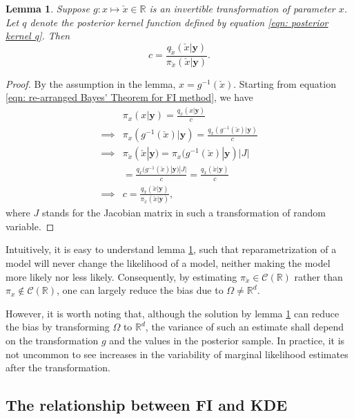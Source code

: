 \documentclass[%
 reprint,
 amsmath,amssymb,
 aps,
]{revtex4-2}
\newtheorem{lemma}[theorem]{Lemma}
\def\R{\mathbb{R}}
\def\ybold{\mathbf{y}}
\begin{document}
\begin{lemma} \label{lemma: FI transforming the re-arranged Bayes theorem}
    Suppose $g: x \mapsto \check{x} \in \R$ is an invertible transformation of parameter $x$. Let $q$ denote the posterior kernel function defined by equation \eqref{eqn: posterior kernel q}. Then 
    \begin{equation*}
        c = \frac{q_{\check{x}}(\check{x}|\ybold)}{\pi_{\check{x}}(\check{x}|\ybold)}.
    \end{equation*}
\end{lemma}
\begin{proof}
    By the assumption in the lemma, $x = g^{-1}(\check{x})$. Starting from equation \eqref{eqn: re-arranged Bayes' Theorem for FI method}, we have
    \begin{align*}
        & \pi_x(x|\ybold) = \frac{q_x(x|\ybold)}{c} \\
        \implies & \pi_x(g^{-1}(\check{x})|\ybold) = \frac{q_x(g^{-1}(\check{x})|\ybold)}{c} \\
        \implies & \pi_{\check{x}}(\check{x}|\ybold) = \pi_x(g^{-1}(\check{x})|\ybold)|J| \\
        & = \frac{q_x(g^{-1}(\check{x})|\ybold)|J|}{c} = \frac{q_{\check{x}}(\check{x}|\ybold)}{c} \\
        \implies & c = \frac{q_{\check{x}}(\check{x}|\ybold)}{\pi_{\check{x}}(\check{x}|\ybold)},
    \end{align*}
    where $J$ stands for the Jacobian matrix in such a transformation of random variable.
\end{proof}
Intuitively, it is easy to understand lemma \ref{lemma: FI transforming the re-arranged Bayes theorem}, such that reparametrization of a model will never change the likelihood of a model, neither making the model more likely nor less likely. Consequently, by estimating $\pi_{\check{x}} \in \mathcal{C}(\R)$ rather than $\pi_x \notin \mathcal{C}(\R)$, one can largely reduce the bias due to $\Omega \neq \R^d$.

However, it is worth noting that, although the solution by lemma \ref{lemma: FI transforming the re-arranged Bayes theorem} can reduce the bias by transforming $\Omega$ to $\R^d$, the variance of such an estimate shall depend on the transformation $g$ and the values in the posterior sample. In practice, it is not uncommon to see increases in the variability of marginal likelihood estimates after the transformation.

\subsection{\label{subsec:relationship between FI and KDE} The relationship between FI and KDE}
\end{document}
